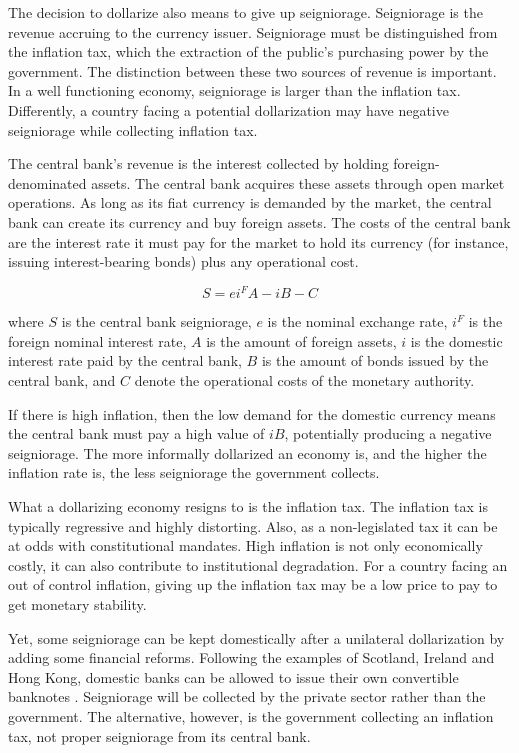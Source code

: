 \documentclass[12pt]{article}
\begin{document}
The decision to dollarize also means to give up seigniorage. Seigniorage is the revenue accruing to the currency issuer. Seigniorage must be distinguished from the inflation tax, which the extraction of the public's purchasing power by the government. The distinction between these two sources of revenue is important. In a well functioning economy, seigniorage is larger than the inflation tax. Differently, a country facing a potential dollarization may have negative seigniorage while collecting inflation tax.

The central bank's revenue is the interest collected by holding foreign-denominated assets. The central bank acquires these assets through open market operations. As long as its fiat currency is demanded by the market, the central bank can create its currency and buy foreign assets. The costs of the central bank are the interest rate it must pay for the market to hold its currency (for instance, issuing interest-bearing bonds) plus any operational cost.

\begin{equation}\label{Eq:1}
    S = ei^FA - iB - C
\end{equation}

where $S$ is the central bank seigniorage, $e$ is the nominal exchange rate, $i^F$ is the foreign nominal interest rate, $A$ is the amount of foreign assets, $i$ is the domestic interest rate paid by the central bank, $B$ is the amount of bonds issued by the central bank, and $C$ denote the operational costs of the monetary authority.

If there is high inflation, then the low demand for the domestic currency means the central bank must pay a high value of $iB$, potentially producing a negative seigniorage. The more informally dollarized an economy is, and the higher the inflation rate is, the less seigniorage the government collects.

What a dollarizing economy resigns to is the inflation tax. The inflation tax is typically regressive and highly distorting. Also, as a non-legislated tax it can be at odds with constitutional mandates. High inflation is not only economically costly, it can also contribute to institutional degradation. For a country facing an out of control inflation, giving up the inflation tax may be a low price to pay to get monetary stability.

Yet, some seigniorage can be kept domestically after a unilateral dollarization by adding some financial reforms. Following the examples of Scotland, Ireland and Hong Kong, domestic banks can be allowed to issue their own convertible banknotes \parencite[see][]{Hogan2012}. Seigniorage will be collected by the private sector rather than the government. The alternative, however, is the government collecting an inflation tax, not proper seigniorage from its central bank.
\end{document}
